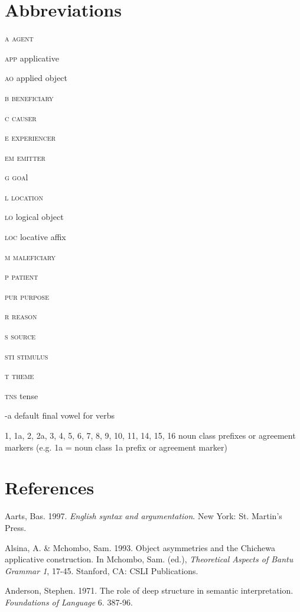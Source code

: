\section{ Abbreviations}

\textsc{a}    \textsc{agent}

\textsc{app}    applicative

\textsc{ao}    applied object 

\textsc{b}    \textsc{beneficiary}

\textsc{c}    \textsc{causer}

\textsc{e}     \textsc{experiencer}

\textsc{em}    \textsc{emitter}

\textsc{g}    \textsc{goa}l

\textsc{l}    \textsc{location}

\textsc{lo}    logical object 

\textsc{loc}    locative affix

\textsc{m}    \textsc{maleficiary}

\textsc{p}     \textsc{patient}

\textsc{pur    }\textsc{purpose }

\textsc{r}    \textsc{reason}

\textsc{s}    \textsc{source}

\textsc{sti}    \textsc{stimulus}

\textsc{t}    \textsc{theme}

\textsc{tns}    tense 

{}-a    default final vowel for verbs

1, 1a, 2, 2a, 3, 4, 5, 6, 7, 8, 9, 10, 11, 14, 15, 16 noun class prefixes or agreement markers (e.g. 1a = noun class 1a prefix or agreement marker)

\section{ References}

Aarts, Bas. 1997. \textit{English syntax and argumentation}. New York: St. Martin's Press.

Alsina, A. \& Mchombo, Sam. 1993. Object asymmetries and the Chichewa applicative construction. In Mchombo, Sam. (ed.), \textit{Theoretical Aspects of Bantu Grammar 1}, 17-45. Stanford, CA: CSLI Publications.

Anderson, Stephen. 1971. The role of deep structure in semantic interpretation. \textit{Foundations of Language }6. 387-96.

